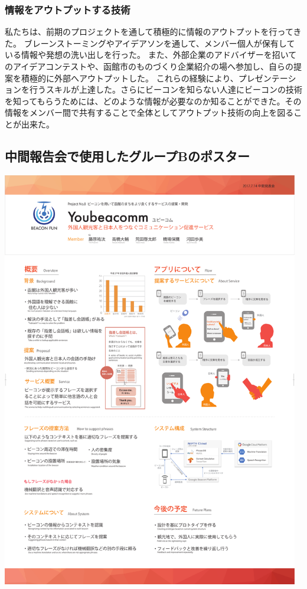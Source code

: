\documentclass[11pt,papersize]{jsbook}
\begin{document}
\subsection{情報をアウトプットする技術}
 私たちは、前期のプロジェクトを通して積極的に情報のアウトプットを行ってきた。
ブレーンストーミングやアイデアソンを通して、メンバー個人が保有している情報や発想の洗い出しを行った。
また、外部企業のアドバイザーを招いてのアイデアコンテストや、函館市のものづくり企業紹介の場へ参加し、自らの提案を積極的に外部へアウトプットした。
これらの経験により、プレゼンテーションを行うスキルが上達した。さらにビーコンを知らない人達にビーコンの技術を知ってもらうためには、どのような情報が必要なのか知ることができた。その情報をメンバー間で共有することで全体としてアウトプット技術の向上を図ることが出来た。 

\begin{appendix}

\chapter{中間報告会で使用したグループBのポスター}
\begin{center}
\includegraphics[width=13cm]{img/gbt.pdf}
\end{center}

\end{appendix}
\end{document}
